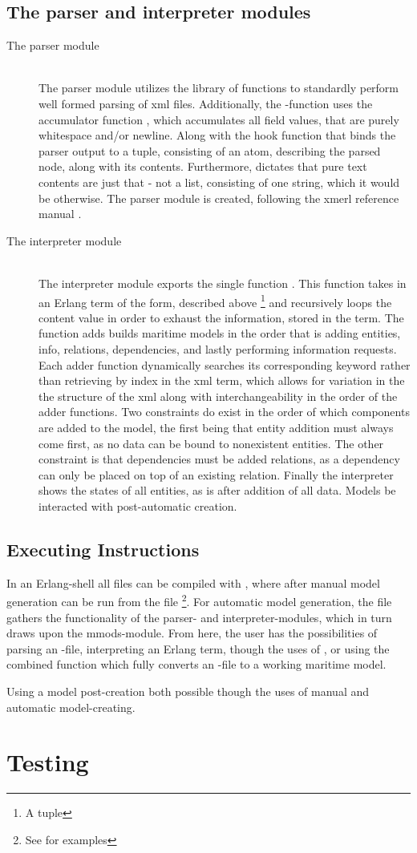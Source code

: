 \subsection{The parser and interpreter modules}

\begin{description}
	\item[The parser module]\ \\
		The parser module utilizes the  library of functions to standardly perform well formed parsing of xml files. Additionally, the -function uses the accumulator function , which accumulates all field values, that are  purely whitespace and/or newline. Along with the hook function  that binds the parser output to a tuple, consisting of an atom, describing the parsed node, along with its contents. Furthermore,  dictates that pure text contents are just that - not a list, consisting of one string, which it would be otherwise. The parser module is created, following the xmerl reference manual \cite{xmerl}.
	\item[The interpreter module]\ \\
		The interpreter module exports the single function . This function takes in an Erlang term of the form, described above \footnote{A tuple} and recursively loops the content value in order to exhaust the information, stored in the term. The  function adds builds maritime models in the order that is adding entities, info, relations, dependencies, and lastly performing information requests. Each adder function dynamically searches its corresponding keyword rather than retrieving by index in the xml term, which allows for variation in the the structure of the xml along with interchangeability in the order of the adder functions. Two constraints do exist in the order of which components are added to the model, the first being that entity addition must always come first, as no data can be bound to nonexistent entities. The other constraint is that dependencies must be added  relations, as a dependency can only be placed on top of an existing relation. Finally the interpreter shows the states of all entities, as is after addition of all data. Models  be interacted with post-automatic creation.
\end{description}
\subsection{Executing Instructions}
In an Erlang-shell all files can be compiled with , where after manual model generation can be run from the  file \footnote{See  for examples}.
For automatic model generation, the  file gathers the functionality of the parser- and interpreter-modules, which in turn draws upon the mmods-module. From here, the user has the possibilities of parsing an -file, interpreting an Erlang term, though the uses of ,  or using the combined function  which fully converts an -file to a working maritime model.

Using a model post-creation both possible though the uses of manual and automatic model-creating. 
\section{Testing}

